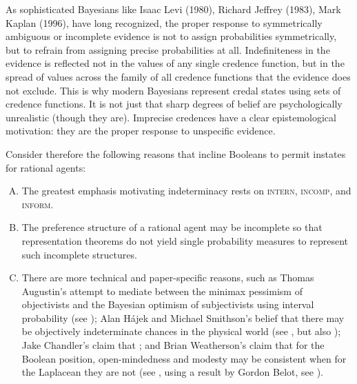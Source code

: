 \documentclass[phd,12pt,oneside]{ubcthesis}
\begin{document}
\begin{quotex}
  As sophisticated Bayesians like Isaac Levi (1980), Richard Jeffrey
  (1983), Mark Kaplan (1996), have long recognized, the proper
  response to symmetrically ambiguous or incomplete evidence is not to
  assign probabilities symmetrically, but to refrain from assigning
  precise probabilities at all. Indefiniteness in the evidence is
  reflected not in the values of any single credence function, but in
  the spread of values across the family of all credence functions
  that the evidence does not exclude. This is why modern Bayesians
  represent credal states using sets of credence functions. It is not
  just that sharp degrees of belief are psychologically unrealistic
  (though they are). Imprecise credences have a clear epistemological
  motivation: they are the proper response to unspecific evidence.
\end{quotex}

Consider therefore the following reasons that incline Booleans to
permit instates for rational agents:

\begin{enumerate}[(A)]
\item The greatest emphasis motivating indeterminacy rests on
  \textsc{intern}, \textsc{incomp}, and \textsc{inform}.
\item The preference structure of a rational agent may be incomplete
  so that representation theorems do not yield single probability
  measures to represent such incomplete
  structures.\label{page:houwieve}
\item There are more technical and paper-specific reasons, such as
  Thomas Augustin's attempt to mediate between the minimax pessimism
  of objectivists and the Bayesian optimism of subjectivists using
  interval probability (see ); Alan
  H{\'a}jek and Michael Smithson's belief that there may be
  objectively indeterminate chances in the physical world (see
  , but also ); Jake Chandler's claim that 
  ; and Brian Weatherson's claim that for the
  Boolean position, open-mindedness and modesty may be consistent when
  for the Laplacean they are not (see , using
  a result by Gordon Belot, see ).
\end{enumerate}
\end{document}
